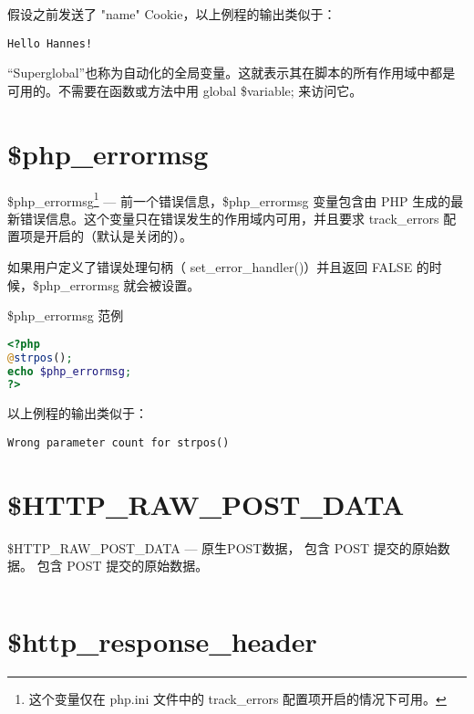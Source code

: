 假设之前发送了 "name" Cookie，以上例程的输出类似于：

\begin{verbatim}
Hello Hannes!
\end{verbatim}

“Superglobal”也称为自动化的全局变量。这就表示其在脚本的所有作用域中都是可用的。不需要在函数或方法中用 global \$variable; 来访问它。

\section{\$php\_errormsg}

\$php\_errormsg\footnote{这个变量仅在 php.ini 文件中的 track\_errors 配置项开启的情况下可用。} — 前一个错误信息，\$php\_errormsg 变量包含由 PHP 生成的最新错误信息。这个变量只在错误发生的作用域内可用，并且要求 track\_errors 配置项是开启的（默认是关闭的）。

如果用户定义了错误处理句柄（ set\_error\_handler()）并且返回 FALSE 的时候，\$php\_errormsg 就会被设置。


\begin{example}
\$php\_errormsg 范例
\begin{lstlisting}[language=PHP]
<?php
@strpos();
echo $php_errormsg;
?>
\end{lstlisting}
\end{example}

以上例程的输出类似于：

\begin{verbatim}
Wrong parameter count for strpos()
\end{verbatim}






\section{\$HTTP\_RAW\_POST\_DATA}


\$HTTP\_RAW\_POST\_DATA — 原生POST数据， 包含 POST 提交的原始数据。 包含 POST 提交的原始数据。

\begin{example}

\begin{lstlisting}[language=PHP]

\end{lstlisting}
\end{example}

\section{\$http\_response\_header}



